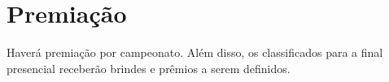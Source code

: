 \section{Premiação}

Haverá premiação por campeonato. Além disso, os classificados para a final presencial receberão brindes e prêmios a serem definidos.

%


%


%
